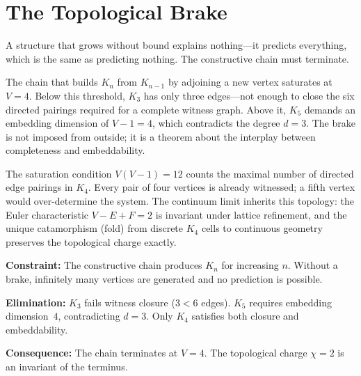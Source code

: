 \documentclass[11pt,a4paper]{book}
\begin{document}
\chapter{The Topological Brake}
\label{ch:topological-brake}

A structure that grows without bound explains nothing---it predicts everything,
which is the same as predicting nothing.  The constructive chain must terminate.

The chain that builds $K_n$ from $K_{n-1}$ by adjoining a new vertex saturates
at $V = 4$.  Below this threshold, $K_3$ has only three edges---not enough to
close the six directed pairings required for a complete witness graph.  Above
it, $K_5$ demands an embedding dimension of $V - 1 = 4$, which contradicts
the degree $d = 3$.  The brake is not imposed from outside; it is a theorem
about the interplay between completeness and embeddability.

The saturation condition $V(V-1) = 12$ counts the maximal number of directed
edge pairings in $K_4$.  Every pair of four vertices is already witnessed;
a fifth vertex would over-determine the system.  The continuum limit inherits
this topology: the Euler characteristic $V - E + F = 2$ is invariant under
lattice refinement, and the unique catamorphism (fold) from discrete $K_4$
cells to continuous geometry preserves the topological charge exactly.

\textbf{Constraint:}
The constructive chain produces $K_n$ for increasing $n$.  Without a brake,
infinitely many vertices are generated and no prediction is possible.

\textbf{Elimination:}
$K_3$ fails witness closure ($3 < 6$ edges).  $K_5$ requires embedding
dimension~$4$, contradicting $d = 3$.  Only $K_4$ satisfies both closure
and embeddability.

\textbf{Consequence:}
The chain terminates at $V = 4$.  The topological charge $\chi = 2$ is
an invariant of the terminus.
\end{document}
